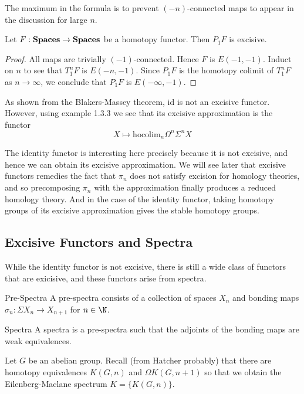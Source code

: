 \documentclass[a4paper]{article}
\begin{document}
The maximum in the formula is to prevent $(-n)$-connected maps to appear in the discussion for large $n$. 

\begin{thm}{}{} Let $F:\bold{Spaces}\to\bold{Spaces}$ be a homotopy functor. Then $P_1F$ is excisive. \tcbline
\begin{proof}
All maps are trivially $(-1)$-connected. Hence $F$ is $E(-1,-1)$. Induct on $n$ to see that $T_1^nF$ is $E(-n,-1)$. Since $P_1F$ is the homotopy colimit of $T_1^nF$ as $n\to\infty$, we conclude that $P_1F$ is $E(-\infty,-1)$. 
\end{proof}
\end{thm}

\begin{eg}{}{} As shown from the Blakers-Massey theorem, $\text{id}$ is not an excisive functor. However, using example 1.3.3 we see that its excisive approximation is the functor $$X\mapsto\text{hocolim}_n\Omega^n\Sigma^n X$$
\end{eg}

The identity functor is interesting here precisely because it is not excisive, and hence we can obtain its excisive approximation. We will see later that excisive functors remedies the fact that $\pi_n$ does not satisfy excision for homology theories, and so precomposing $\pi_n$ with the approximation finally produces a reduced homology theory. And in the case of the identity functor, taking homotopy groups of its excisive approximation gives the stable homotopy groups. 

\subsection{Excisive Functors and Spectra}
While the identity functor is not excisive, there is still a wide class of functors that are exicisive, and these functors arise from spectra. 

\begin{defn}{Pre-Spectra}{} A pre-spectra consists of a collection of spaces $X_n$ and bonding maps $\sigma_n:\Sigma X_n\to X_{n+1}$ for $n\in\N$. 
\end{defn}

\begin{defn}{Spectra}{} A spectra is a pre-spectra such that the adjoints of the bonding maps are weak equivalences. 
\end{defn}

\begin{eg}{}{} Let $G$ be an abelian group. Recall (from Hatcher probably) that there are homotopy equivalences $K(G,n)$ and $\Omega K(G,n+1)$ so that we obtain the Eilenberg-Maclane spectrum $K=\{K(G,n)\}$. 
\end{eg}
\end{document}
